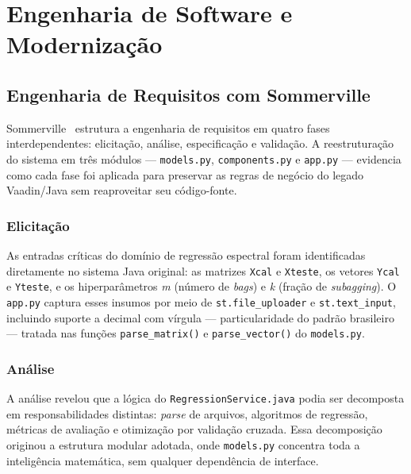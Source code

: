 \chapter{Engenharia de Software e Modernização}
\label{sec:engenhariasoftware}

\section{Engenharia de Requisitos com Sommerville}

Sommerville~\cite{sommerville2011} estrutura a engenharia de requisitos em quatro fases interdependentes: elicitação, análise, especificação e validação. A reestruturação do sistema em três módulos — \texttt{models.py}, \texttt{components.py} e \texttt{app.py} — evidencia como cada fase foi aplicada para preservar as regras de negócio do legado Vaadin/Java sem reaproveitar seu código-fonte.

\subsection{Elicitação}
As entradas críticas do domínio de regressão espectral foram identificadas diretamente no sistema Java original: as matrizes \texttt{Xcal} e \texttt{Xteste}, os vetores \texttt{Ycal} e \texttt{Yteste}, e os hiperparâmetros \textit{m} (número de \textit{bags}) e \textit{k} (fração de \textit{subagging}). O \texttt{app.py} captura esses insumos por meio de \texttt{st.file\_uploader} e \texttt{st.text\_input}, incluindo suporte a decimal com vírgula — particularidade do padrão brasileiro — tratada nas funções \texttt{parse\_matrix()} e \texttt{parse\_vector()} do \texttt{models.py}.

\subsection{Análise}
A análise revelou que a lógica do \texttt{RegressionService.java} podia ser decomposta em responsabilidades distintas: \textit{parse} de arquivos, algoritmos de regressão, métricas de avaliação e otimização por validação cruzada. Essa decomposição originou a estrutura modular adotada, onde \texttt{models.py} concentra toda a inteligência matemática, sem qualquer dependência de interface.

